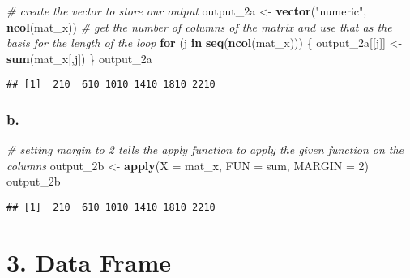 \documentclass[]{article}
\newenvironment{Shaded}{\begin{snugshade}}{\end{snugshade}}
\newcommand{\CommentTok}[1]{\textcolor[rgb]{0.56,0.35,0.01}{\textit{#1}}}
\newcommand{\ControlFlowTok}[1]{\textcolor[rgb]{0.13,0.29,0.53}{\textbf{#1}}}
\newcommand{\DataTypeTok}[1]{\textcolor[rgb]{0.13,0.29,0.53}{#1}}
\newcommand{\DecValTok}[1]{\textcolor[rgb]{0.00,0.00,0.81}{#1}}
\newcommand{\KeywordTok}[1]{\textcolor[rgb]{0.13,0.29,0.53}{\textbf{#1}}}
\newcommand{\NormalTok}[1]{#1}
\newcommand{\StringTok}[1]{\textcolor[rgb]{0.31,0.60,0.02}{#1}}
\begin{document}
\begin{Shaded}
\begin{Highlighting}[]
\CommentTok{# create the vector to store our output}
\NormalTok{output_2a <-}\StringTok{ }\KeywordTok{vector}\NormalTok{(}\StringTok{"numeric"}\NormalTok{, }\KeywordTok{ncol}\NormalTok{(mat_x))}
\CommentTok{# get the number of columns of the matrix and use that as the basis for the length of the loop}
\ControlFlowTok{for}\NormalTok{ (j }\ControlFlowTok{in} \KeywordTok{seq}\NormalTok{(}\KeywordTok{ncol}\NormalTok{(mat_x))) \{}
\NormalTok{  output_2a[[j]] <-}\StringTok{ }\KeywordTok{sum}\NormalTok{(mat_x[,j])}
\NormalTok{\}}
\NormalTok{output_2a}
\end{Highlighting}
\end{Shaded}

\begin{verbatim}
## [1]  210  610 1010 1410 1810 2210
\end{verbatim}

\hypertarget{b.}{%
\subsubsection{b.}\label{b.}}

\begin{Shaded}
\begin{Highlighting}[]
\CommentTok{# setting margin to 2 tells the apply function to apply the given function on the columns}
\NormalTok{output_2b <-}\StringTok{ }\KeywordTok{apply}\NormalTok{(}\DataTypeTok{X =}\NormalTok{ mat_x, }\DataTypeTok{FUN =}\NormalTok{ sum, }\DataTypeTok{MARGIN =} \DecValTok{2}\NormalTok{)}
\NormalTok{output_2b}
\end{Highlighting}
\end{Shaded}

\begin{verbatim}
## [1]  210  610 1010 1410 1810 2210
\end{verbatim}

\hypertarget{data-frame}{%
\section{3. Data Frame}\label{data-frame}}
\end{document}
